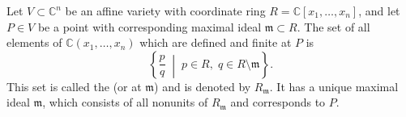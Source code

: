 Let $V \subset \mathbb{C}^n$ be an affine variety with coordinate ring $R = \mathbb{C}[x_1, \ldots, x_n]$, and let $P \in V$ be a point with corresponding maximal ideal $\mathfrak{m} \subset R$. The set of all elements of $\mathbb{C}(x_1, \ldots, x_n)$ which are defined and finite at $P$ is
$$\left\{ \frac{p}{q} \;\middle|\; p \in R,\; q \in R \setminus \mathfrak{m} \right\}.$$
This set is called the  (or at $\mathfrak{m}$) and is denoted by $R_{\mathfrak{m}}$. It has a unique maximal ideal $\mathfrak{m}$, which consists of all nonunits of $R_{\mathfrak{m}}$ and corresponds to $P$.
